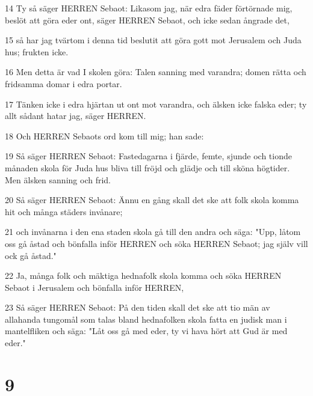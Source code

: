 \par 14 Ty så säger HERREN Sebaot: Likasom jag, när edra fäder förtörnade mig, beslöt att göra eder ont, säger HERREN Sebaot, och icke sedan ångrade det,
\par 15 så har jag tvärtom i denna tid beslutit att göra gott mot Jerusalem och Juda hus; frukten icke.
\par 16 Men detta är vad I skolen göra: Talen sanning med varandra; domen rätta och fridsamma domar i edra portar.
\par 17 Tänken icke i edra hjärtan ut ont mot varandra, och älsken icke falska eder; ty allt sådant hatar jag, säger HERREN.
\par 18 Och HERREN Sebaots ord kom till mig; han sade:
\par 19 Så säger HERREN Sebaot: Fastedagarna i fjärde, femte, sjunde och tionde månaden skola för Juda hus bliva till fröjd och glädje och till sköna högtider. Men älsken sanning och frid.
\par 20 Så säger HERREN Sebaot: Ännu en gång skall det ske att folk skola komma hit och många städers invånare;
\par 21 och invånarna i den ena staden skola gå till den andra och säga: "Upp, låtom oss gå åstad och bönfalla inför HERREN och söka HERREN Sebaot; jag själv vill ock gå åstad."
\par 22 Ja, många folk och mäktiga hednafolk skola komma och söka HERREN Sebaot i Jerusalem och bönfalla inför HERREN,
\par 23 Så säger HERREN Sebaot: På den tiden skall det ske att tio män av allahanda tungomål som talas bland hednafolken skola fatta en judisk man i mantelfliken och säga: "Låt oss gå med eder, ty vi hava hört att Gud är med eder."

\chapter{9}

